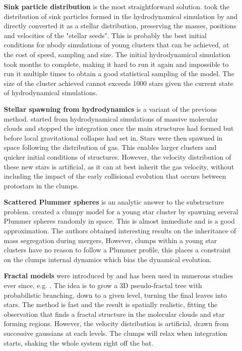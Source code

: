 \begin{itemize}
\item[\textbf{Sink particle distribution}] is the most straightforward solution. \cite{Moeckel2010} took the distribution of sink particles formed in the hydrodynamical simulation by \cite{Bate2009} and directly converted it as a stellar distribution, preserving the masses, positions and velocities of the "stellar seeds". This is probably the best initial conditions for nbody simulations of young clusters that can be achieved, at the cost of speed, sampling and size. The initial hydrodynamical simulation took months to complete, making it hard to run it again and impossible to run it multiple times to obtain a good statistical sampling of the model. The size of the cluster achieved cannot exceeds 1000 stars given the current state of hydrodynamical simulations.

\item[\textbf{Stellar spawning from hydrodynamics}] is a variant of the previous method. \cite{Fujii2016} started from hydrodynamical simulations of massive molecular clouds and stopped the integration once the main structures had formed but before local gravitational collapse had set in. Stars were then spawned in space following the distribution of gas. This enables larger clusters and quicker initial conditions of structures. However, the velocity distribution of these new stars is artificial, as it can at best inherit the gas velocity, without including the impact of the early collisional evolution that occurs between protostars in the clumps.

\item[\textbf{Scattered Plummer spheres}] is an analytic answer to the substructure problem. \cite{McMillan2007} created a clumpy model for a young star cluster by spawning several Plummer spheres randomly in space. This is almost immediate and is a good approximation. The authors obtained interesting results on the inheritance of mass segregation during mergers. However, clumps within a young star clusters have no reason to follow a Plummer profile, this places a constraint on the clumps internal dynamics which bias the dynamical evolution.

\item[\textbf{Fractal models}] were introduced by \cite{Goodwin2004} and has been used in numerous studies ever since, e.g. \cite{Allison2009b,Kouwenhoven2010,Parker2016}. The idea is to grow a 3D pseudo-fractal tree with probabilistic branching, down to a given level, turning the final leaves into stars. The method is fast and the result is spatially realistic, fitting the observation that finds a fractal structure in the molecular clouds and star forming regions. However, the velocity distribution is artificial, drawn from successive gaussians at each levels. The clumps will relax when integration starts, shaking the whole system right off the bat.

\end{itemize}


